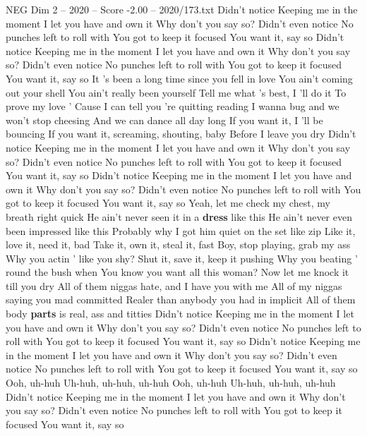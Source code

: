 \begin{textsample}{NEG Dim 2 – 2020 – Score -2.00 – 2020/173.txt}  \label{ex:f2_neg_022}
Didn't notice Keeping me in the moment I let you have and own it Why don't you say so?
Didn't even notice No punches left to roll with You got to keep it focused You want it, say so Didn't notice Keeping me in the moment I let you have and own it Why don't you say so?
Didn't even notice No punches left to roll with You got to keep it focused You want it, say so It 's been a long time since you fell in love You ain't coming out your shell You ain't really been yourself Tell me what 's best, I 'll do it To prove my love ' Cause I can tell you 're quitting reading I wanna bug and we won't stop cheesing And we can dance all day long If you want it, I 'll be bouncing If you want it, screaming, shouting, baby Before I leave you dry Didn't notice Keeping me in the moment I let you have and own it Why don't you say so?
Didn't even notice No punches left to roll with You got to keep it focused You want it, say so Didn't notice Keeping me in the moment I let you have and own it Why don't you say so?
Didn't even notice No punches left to roll with You got to keep it focused You want it, say so Yeah, let me check my chest, my breath right quick He ain't never seen it in a \textbf{dress} like this He ain't never even been impressed like this Probably why I got him quiet on the set like zip Like it, love it, need it, bad Take it, own it, steal it, fast Boy, stop playing, grab my ass Why you actin ' like you shy?
Shut it, save it, keep it pushing Why you beating ' round the bush when You know you want all this woman?
Now let me knock it till you dry All of them niggas hate, and I have you with me All of my niggas saying you mad committed Realer than anybody you had in implicit All of them body \textbf{parts} is real, ass and titties Didn't notice Keeping me in the moment I let you have and own it Why don't you say so?
Didn't even notice No punches left to roll with You got to keep it focused You want it, say so Didn't notice Keeping me in the moment I let you have and own it Why don't you say so?
Didn't even notice No punches left to roll with You got to keep it focused You want it, say so Ooh, uh-huh Uh-huh, uh-huh, uh-huh Ooh, uh-huh Uh-huh, uh-huh, uh-huh Didn't notice Keeping me in the moment I let you have and own it Why don't you say so?
Didn't even notice No punches left to roll with You got to keep it focused You want it, say so

\end{textsample}
